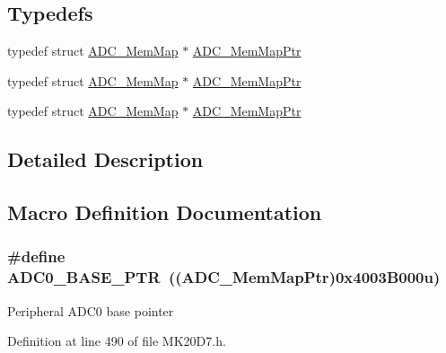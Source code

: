 \subsection*{Typedefs}
\begin{DoxyCompactItemize}
\item 
typedef struct \hyperlink{struct_a_d_c___mem_map}{A\+D\+C\+\_\+\+Mem\+Map} $\ast$ \hyperlink{group___a_d_c___peripheral_ga1673c677bf7c0ca339c8563e06de75fa}{A\+D\+C\+\_\+\+Mem\+Map\+Ptr}
\item 
typedef struct \hyperlink{struct_a_d_c___mem_map}{A\+D\+C\+\_\+\+Mem\+Map} $\ast$ \hyperlink{group___a_d_c___peripheral_ga1673c677bf7c0ca339c8563e06de75fa}{A\+D\+C\+\_\+\+Mem\+Map\+Ptr}
\item 
typedef struct \hyperlink{struct_a_d_c___mem_map}{A\+D\+C\+\_\+\+Mem\+Map} $\ast$ \hyperlink{group___a_d_c___peripheral_ga1673c677bf7c0ca339c8563e06de75fa}{A\+D\+C\+\_\+\+Mem\+Map\+Ptr}
\end{DoxyCompactItemize}


\subsection{Detailed Description}


\subsection{Macro Definition Documentation}
\subsubsection[{\texorpdfstring{A\+D\+C0\+\_\+\+B\+A\+S\+E\+\_\+\+P\+TR}{ADC0_BASE_PTR}}]{\setlength{\rightskip}{0pt plus 5cm}\#define A\+D\+C0\+\_\+\+B\+A\+S\+E\+\_\+\+P\+TR~(({\bf A\+D\+C\+\_\+\+Mem\+Map\+Ptr})0x4003\+B000u)}\hypertarget{group___a_d_c___peripheral_ga6cec2f227a3a37a9fccaa830740f1f5e}{}\label{group___a_d_c___peripheral_ga6cec2f227a3a37a9fccaa830740f1f5e}
Peripheral A\+D\+C0 base pointer 

Definition at line 490 of file M\+K20\+D7.\+h.

